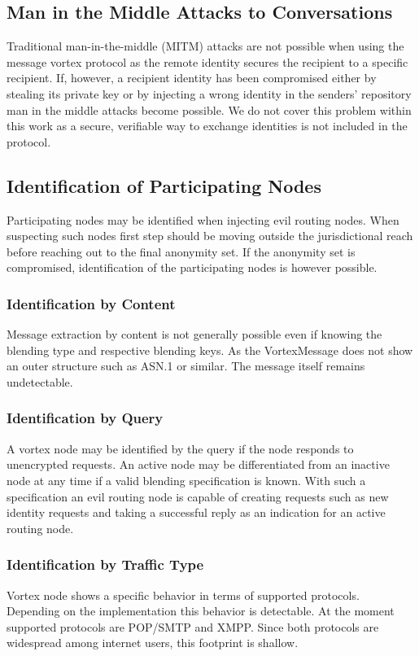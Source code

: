 \subsection{Man in the Middle Attacks to Conversations}
Traditional man-in-the-middle (MITM) attacks are not possible when using the message vortex protocol as the remote identity secures the recipient to a specific recipient. If, however, a recipient identity has been compromised either by stealing its private key or by injecting a wrong identity in the senders' repository man in the middle attacks become possible. We do not cover this problem within this work as a secure, verifiable way to exchange identities is not included in the protocol.

\subsection{Identification of Participating Nodes}
Participating nodes may be identified when injecting evil routing nodes. When suspecting such nodes first step should be moving outside the jurisdictional reach before reaching out to the final anonymity set. If the anonymity set is compromised, identification of the participating nodes is however possible.

\subsubsection{Identification by Content}
Message extraction by content is not generally possible even if knowing the blending type and respective blending keys. As the VortexMessage does not show an outer structure such as ASN.1 or similar. The message itself remains undetectable.

\subsubsection{Identification by Query}
A vortex node may be identified by the query if the node responds to unencrypted requests. An active node may be differentiated from an inactive node at any time if a valid blending specification is known. With such a specification an evil routing node is capable of creating requests such as new identity requests and taking a successful reply as an indication for an active routing node.

\subsubsection{Identification by Traffic Type}
Vortex node shows a specific behavior in terms of supported protocols. Depending on the implementation this behavior is detectable. At the moment supported protocols are POP/SMTP and XMPP. Since both protocols are widespread among internet users, this footprint is shallow.

